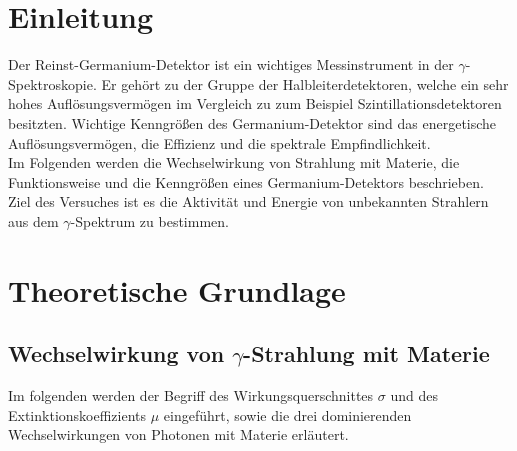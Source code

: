\section{Einleitung}
Der Reinst-Germanium-Detektor ist ein wichtiges Messinstrument in der $\gamma$-Spektroskopie. Er gehört zu der Gruppe der Halbleiterdetektoren, welche ein sehr hohes Auflösungsvermögen im Vergleich zu zum Beispiel Szintillationsdetektoren besitzten. Wichtige Kenngrößen des Germanium-Detektor sind das energetische Auflösungsvermögen, die Effizienz und die spektrale Empfindlichkeit. \\
Im Folgenden werden die Wechselwirkung von Strahlung mit Materie, die Funktionsweise und die Kenngrößen eines Germanium-Detektors beschrieben. \\
Ziel des Versuches ist es die Aktivität und Energie von unbekannten Strahlern aus dem $\gamma$-Spektrum zu bestimmen.


\section{Theoretische Grundlage}
\label{sec:Theorie}

\subsection{Wechselwirkung von \texorpdfstring{$\gamma$}{}-Strahlung mit Materie}
Im folgenden werden der Begriff des Wirkungsquerschnittes $\sigma$ und des Extinktionskoeffizients $\mu$ eingeführt, sowie die drei dominierenden Wechselwirkungen von Photonen mit Materie erläutert.



